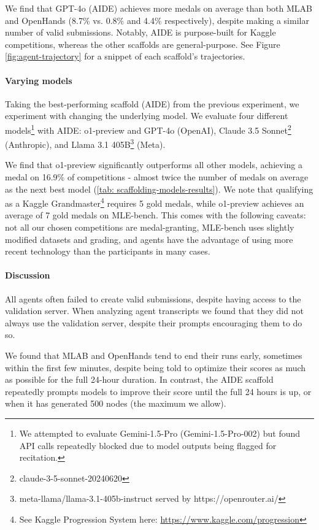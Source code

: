 \documentclass{article} %
\begin{document}
We find that GPT-4o (AIDE) achieves more medals on average than both MLAB and OpenHands (8.7\% vs. 0.8\% and 4.4\% respectively), despite making a similar number of valid submissions. Notably, AIDE is purpose-built for Kaggle competitions, whereas the other scaffolds are general-purpose. See Figure \ref{fig:agent-trajectory} for a snippet of each scaffold's trajectories.

\paragraph{Varying models}
Taking the best-performing scaffold (AIDE) from the previous experiment, we experiment with changing the underlying model. We evaluate four different models\footnote{We attempted to evaluate Gemini-1.5-Pro (Gemini-1.5-Pro-002) but found API calls repeatedly blocked due to model outputs being flagged for recitation.} with AIDE: o1-preview and GPT-4o (OpenAI), Claude 3.5 Sonnet\footnote{claude-3-5-sonnet-20240620} (Anthropic), and Llama 3.1 405B\footnote{meta-llama/llama-3.1-405b-instruct served by https://openrouter.ai/} (Meta).

We find that o1-preview significantly outperforms all other models, achieving a medal on 16.9\% of competitions - almost twice the number of medals on average as the next best model (\autoref{tab: scaffolding-models-results}). We note that qualifying as a Kaggle Grandmaster\footnote{See Kaggle Progression System here: \href{https://www.kaggle.com/progression}{https://www.kaggle.com/progression}} requires 5 gold medals, while o1-preview achieves an average of 7 gold medals on MLE-bench. This comes with the following caveats: not all our chosen competitions are medal-granting, MLE-bench uses slightly modified datasets and grading, and agents have the advantage of using more recent technology than the participants in many cases.


\paragraph{Discussion} 
All agents often failed to create valid submissions, despite having access to the validation server. When analyzing agent transcripts we found that they did not always use the validation server, despite their prompts encouraging them to do so.

We found that MLAB and OpenHands tend to end their runs early, sometimes within the first few minutes, despite being told to optimize their scores as much as possible for the full 24-hour duration. In contrast, the AIDE scaffold repeatedly prompts models to improve their score until the full 24 hours is up, or when it has generated 500 nodes (the maximum we allow).
\end{document}
